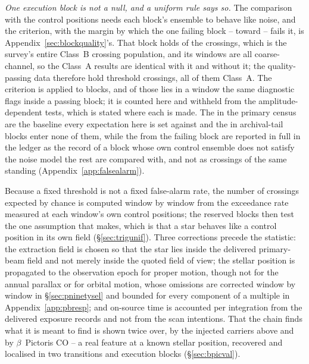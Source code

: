 \emph{One execution block is not a null, and a uniform rule says so.} The
comparison with the control positions needs each block's ensemble to behave
like noise, and the criterion, with the margin by which the one failing block
-- \BqFailBlock{} toward \BqFailStar{} -- fails it, is
Appendix~\ref{sec:blockquality}'s. That block holds
\BqFailNCross{} of the \NCross{} crossings, which is the survey's entire
Class~B crossing population, and its windows are all coarse-channel, so the
Class~A results are identical with it and without it; the quality-passing data
therefore hold \EvNCrossQp{} threshold crossings, all of them Class~A. The
criterion is applied to blocks, and \BkFlagNCrossOther{} of those
\EvNCrossQp{} lies in a window the same diagnostic flags inside a passing
block; it is counted here and withheld from the amplitude-dependent tests,
which is stated where each is made. The \CkNCrossCenA{} in the primary census
are the baseline every expectation here is set against and the
\CeNTailCrossWord{} in archival-tail blocks enter none of them, while the
\BqFailNCross{} from the failing block are reported in full in the ledger as
the record of a block whose own control ensemble does not satisfy the noise
model the rest are compared with, and not as crossings of the same standing
(Appendix~\ref{app:falsealarm}).

Because a fixed threshold is not a fixed false-alarm rate, the number of
crossings expected by chance is computed window by window from the exceedance
rate measured at each window's own control positions; the reserved blocks then
test the one assumption that makes, which is that a star behaves like a control
position in its own field (\S\ref{sec:trigunif}). Three corrections precede
the statistic: the extraction field is chosen so that the star lies inside the
delivered primary-beam field and not merely inside the quoted field of view;
the stellar position is propagated to the observation epoch for proper motion,
though not for the annual parallax or for orbital motion, whose omissions are
corrected window by window in \S\ref{sec:pninetysel} and bounded for every
component of a multiple in Appendix~\ref{app:pbresp}; and on-source time is
accounted per integration from the delivered exposure records and not from the
scan intentions. That the chain finds what it is meant to find is shown twice
over, by the injected carriers above and by $\beta$~Pictoris CO -- a real
feature at a known stellar position, recovered and localised in two transitions
and \CsBpCoBlocks{} execution blocks (\S\ref{sec:bpicval}).

